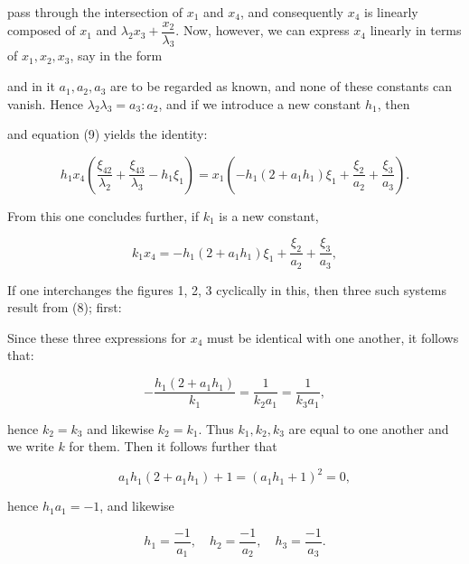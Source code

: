 pass through the intersection of $x_1$ and $x_4$, and consequently $x_4$ is linearly composed of $x_1$ and $\lambda_2 x_3 + \dfrac{x_2}{\lambda_3}$. Now, however, we can express $x_4$ linearly in terms of $x_1, x_2, x_3$, say in the form


and in it $a_1, a_2, a_3$ are to be regarded as known, and none of these constants can vanish. Hence $\lambda_2\lambda_3 = a_3 : a_2$, and if we introduce a new constant $h_1$, then


and equation (9) yields the identity:

\[
h_1 x_4\left(\frac{\xi_{42}}{\lambda_2} + \frac{\xi_{43}}{\lambda_3} - h_1\xi_1\right) = x_1\left(-h_1(2+a_1h_1)\xi_1 + \frac{\xi_2}{a_2} + \frac{\xi_3}{a_3}\right).
\]

From this one concludes further, if $k_1$ is a new constant,

\[
k_1 x_4 = -h_1(2+a_1h_1)\xi_1 + \frac{\xi_2}{a_2} + \frac{\xi_3}{a_3},
\]


If one interchanges the figures 1, 2, 3 cyclically in this, then three such systems result from (8); first:


Since these three expressions for $x_4$ must be identical with one another, it follows that:

\[
-\frac{h_1(2+a_1h_1)}{k_1} = \frac{1}{k_2 a_1} = \frac{1}{k_3 a_1},
\]

hence $k_2 = k_3$ and likewise $k_2 = k_1$. Thus $k_1, k_2, k_3$ are equal to one another and we write $k$ for them. Then it follows further that

\[
a_1 h_1(2+a_1h_1) + 1 = (a_1h_1+1)^2 = 0,
\]

hence $h_1 a_1 = -1$, and likewise

\[
h_1 = \frac{-1}{a_1},\quad h_2 = \frac{-1}{a_2},\quad h_3 = \frac{-1}{a_3}.
\]
